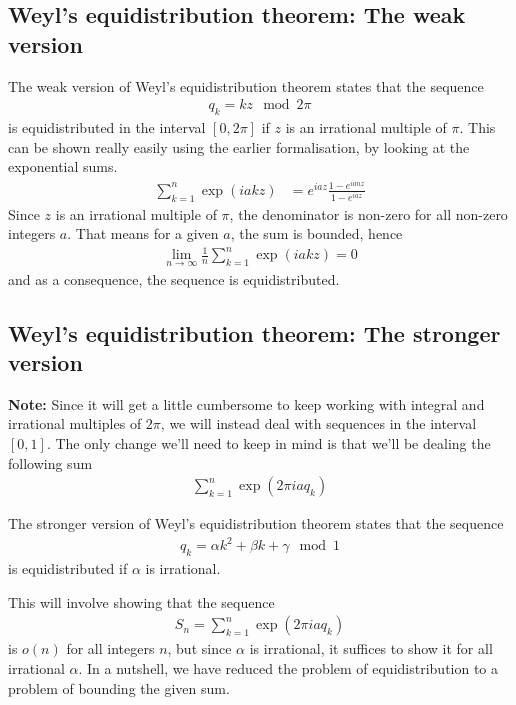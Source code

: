 \documentclass[12pt, titlepage]{article}
\theoremstyle{definition}
\begin{document}
\subsection{Weyl's equidistribution theorem: The weak version}
The weak version of Weyl's equidistribution theorem states that the sequence
\begin{align*}
    q_k = kz \mod 2\pi
\end{align*}
is equidistributed in the interval $[0,2\pi]$ if $z$ is an irrational multiple of $\pi$. This can be shown really easily using the earlier formalisation, by looking at the exponential sums.
\begin{align*}
    \sum_{k=1}^{n} \exp(iakz) &= e^{iaz} \frac{1 - e^{ianz}}{1 - e^{iaz}}
\end{align*}
Since $z$ is an irrational multiple of $\pi$, the denominator is non-zero for all non-zero integers $a$. That means for a given $a$, the sum is bounded, hence
\begin{align*}
    \lim\limits_{n \to \infty} \frac{1}{n} \sum_{k=1}^{n} \exp(iakz) = 0
\end{align*}
and as a consequence, the sequence is equidistributed.

\subsection{Weyl's equidistribution theorem: The stronger version}
\textbf{Note:} Since it will get a little cumbersome to keep working with integral and irrational multiples of $2\pi$, we will instead deal with sequences in the interval $[0,1]$. The only change we'll need to keep in mind is that we'll be dealing the following sum
\begin{align*}
     \sum_{k=1}^{n} \exp(2\pi iaq_k)
\end{align*}

The stronger version of Weyl's equidistribution theorem states that the sequence
\begin{align*}
    q_k = \alpha k^2 + \beta k + \gamma \mod 1
\end{align*}
is equidistributed if $\alpha$ is irrational.
 
This will involve showing that the sequence
\begin{align}
    S_n = \sum_{k=1}^{n} \exp(2\pi i aq_k) \label{target:1}
\end{align}
is $o(n)$ for all integers $n$, but since $\alpha$ is irrational, it suffices to show it for all irrational $\alpha$. In a nutshell, we have reduced the problem of equidistribution to a problem of bounding the given sum.
 
\end{document}
